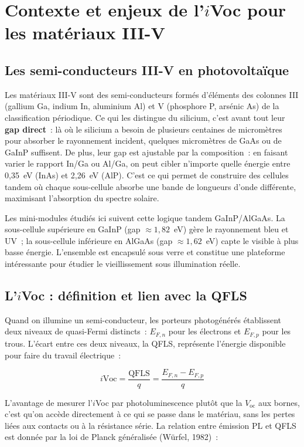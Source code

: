 \documentclass[12pt,a4paper]{report}
\begin{document}
\section{Contexte et enjeux de l'$i$Voc pour les matériaux III-V}

\subsection{Les semi-conducteurs III-V en photovoltaïque}

Les matériaux III-V sont des semi-conducteurs formés d'éléments des colonnes III (gallium Ga, indium In, aluminium Al) et V (phosphore P, arsénic As) de la classification périodique. Ce qui les distingue du silicium, c'est avant tout leur \textbf{gap direct}~: là où le silicium a besoin de plusieurs centaines de micromètres pour absorber le rayonnement incident, quelques micromètres de GaAs ou de GaInP suffisent. De plus, leur gap est ajustable par la composition~: en faisant varier le rapport In/Ga ou Al/Ga, on peut cibler n'importe quelle énergie entre 0,35~eV (InAs) et 2,26~eV (AlP). C'est ce qui permet de construire des cellules tandem où chaque sous-cellule absorbe une bande de longueurs d'onde différente, maximisant l'absorption du spectre solaire.

Les mini-modules étudiés ici suivent cette logique tandem GaInP/AlGaAs. La sous-cellule supérieure en GaInP (gap $\approx 1{,}82$~eV) gère le rayonnement bleu et UV~; la sous-cellule inférieure en AlGaAs (gap $\approx 1{,}62$~eV) capte le visible à plus basse énergie. L'ensemble est encapsulé sous verre et constitue une plateforme intéressante pour étudier le vieillissement sous illumination réelle.

\subsection{L'$i$Voc : définition et lien avec la QFLS}

Quand on illumine un semi-conducteur, les porteurs photogénérés établissent deux niveaux de quasi-Fermi distincts~: $E_{F,n}$ pour les électrons et $E_{F,p}$ pour les trous. L'écart entre ces deux niveaux, la QFLS, représente l'énergie disponible pour faire du travail électrique~:

\begin{equation}
i\text{Voc} = \frac{\text{QFLS}}{q} = \frac{E_{F,n} - E_{F,p}}{q}
\label{eq:QFLS}
\end{equation}

L'avantage de mesurer l'$i$Voc par photoluminescence plutôt que la $V_\text{oc}$ aux bornes, c'est qu'on accède directement à ce qui se passe dans le matériau, sans les pertes liées aux contacts ou à la résistance série. La relation entre émission PL et QFLS est donnée par la loi de Planck généralisée (Würfel, 1982)~:
\end{document}
